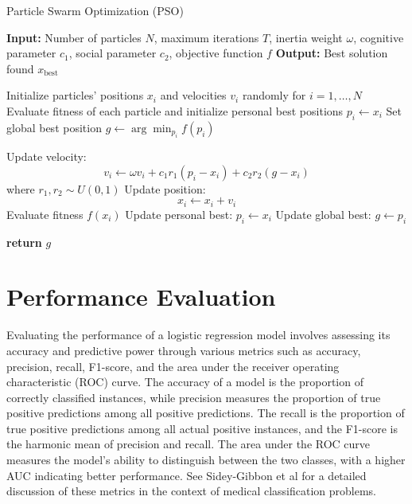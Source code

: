 \documentclass{article}[12pt]
\begin{document}
\begin{algorithm}[H]
\caption{Particle Swarm Optimization (PSO)}
\begin{algorithmic}[1]
\State \textbf{Input:} Number of particles $N$, maximum iterations $T$, inertia weight $\omega$, cognitive parameter $c_1$, social parameter $c_2$, objective function $f$
\State \textbf{Output:} Best solution found $x_\text{best}$

\State Initialize particles' positions $x_i$ and velocities $v_i$ randomly for $i = 1, \dots, N$
\State Evaluate fitness of each particle and initialize personal best positions $p_i \gets x_i$
\State Set global best position $g \gets \arg\min_{p_i} f(p_i)$

        \State Update velocity: 
        \[
        v_i \gets \omega v_i + c_1 r_1 (p_i - x_i) + c_2 r_2 (g - x_i)
        \]
        where $r_1, r_2 \sim U(0, 1)$
        \State Update position: 
        \[
        x_i \gets x_i + v_i
        \]
        \State Evaluate fitness $f(x_i)$
            \State Update personal best: $p_i \gets x_i$
        \EndIf
            \State Update global best: $g \gets p_i$
        \EndIf
    \EndFor
\EndFor

\State \textbf{return} $g$
\end{algorithmic}
\end{algorithm}


\section{Performance Evaluation}
Evaluating the performance of a logistic regression model involves assessing its accuracy and predictive power through various metrics such as accuracy, precision, recall, F1-score, and the area under the receiver operating characteristic (ROC) curve.
The accuracy of a model is the proportion of correctly classified instances, while precision measures the proportion of true positive predictions among all positive predictions. 
The recall is the proportion of true positive predictions among all actual positive instances, and the F1-score is the harmonic mean of precision and recall. 
The area under the ROC curve measures the model's ability to distinguish between the two classes, with a higher AUC indicating better performance.
See Sidey-Gibbon et al \cite{SG2019} for a detailed discussion of these metrics in the context of medical classification problems.
\end{document}
